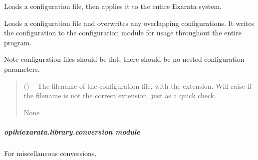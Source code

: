 \documentclass[letterpaper,11pt,english]{sphinxmanual}
\begin{document}
\begin{savenotes}\begin{fulllineitems}
\label{\detokenize{code/opihiexarata.library.config:opihiexarata.library.config.load_then_apply_configuration}}
\pysigstartsignatures
{}
\pysigstopsignatures
\sphinxAtStartPar
Loads a configuration file, then applies it to the entire Exarata system.

\sphinxAtStartPar
Loads a configuration file and overwrites any overlapping
configurations. It writes the configuration to the configuration module
for usage throughout the entire program.

\sphinxAtStartPar
Note configuration files should be flat, there should be no nested
configuration parameters.
\begin{quote}\begin{description}
\sphinxAtStartPar
{} () – The filename of the configuration file, with the extension. Will raise
if the filename is not the correct extension, just as a quick check.

\sphinxAtStartPar
None

\end{description}\end{quote}

\end{fulllineitems}\end{savenotes}


\sphinxstepscope


\subparagraph{opihiexarata.library.conversion module}
\label{\detokenize{code/opihiexarata.library.conversion:module-opihiexarata.library.conversion}}\label{\detokenize{code/opihiexarata.library.conversion:opihiexarata-library-conversion-module}}\label{\detokenize{code/opihiexarata.library.conversion::doc}}
\sphinxAtStartPar
For miscellaneous conversions.
\end{document}
